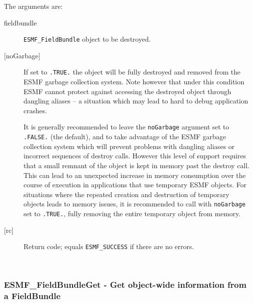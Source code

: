    The arguments are:
   \begin{description}
   \item[fieldbundle]
   {\tt ESMF\_FieldBundle} object to be destroyed.
   \item[{[noGarbage]}]
   If set to {\tt .TRUE.} the object will be fully destroyed and removed
   from the ESMF garbage collection system. Note however that under this
   condition ESMF cannot protect against accessing the destroyed object
   through dangling aliases -- a situation which may lead to hard to debug
   application crashes.
  
   It is generally recommended to leave the {\tt noGarbage} argument
   set to {\tt .FALSE.} (the default), and to take advantage of the ESMF
   garbage collection system which will prevent problems with dangling
   aliases or incorrect sequences of destroy calls. However this level of
   support requires that a small remnant of the object is kept in memory
   past the destroy call. This can lead to an unexpected increase in memory
   consumption over the course of execution in applications that use
   temporary ESMF objects. For situations where the repeated creation and
   destruction of temporary objects leads to memory issues, it is
   recommended to call with {\tt noGarbage} set to {\tt .TRUE.}, fully
   removing the entire temporary object from memory.
   \item[{[rc]}]
   Return code; equals {\tt ESMF\_SUCCESS} if there are no errors.
   \end{description}
   
 
\mbox{}\hrulefill\ 
 
\subsubsection [ESMF\_FieldBundleGet] {ESMF\_FieldBundleGet - Get object-wide information from a FieldBundle}


